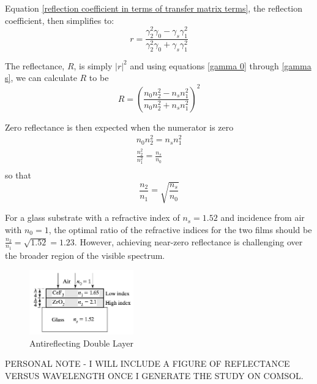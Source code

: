 Equation \ref{reflection coefficient in terms of transfer matrix terms}, the reflection coefficient, then simplifies to:
    \begin{equation}\label{reflection coefficient for 2-layer antireflecting films}
    r = \frac{\gamma_2^2\gamma_0 - \gamma_s\gamma_1^2}{\gamma_2^2\gamma_0 + \gamma_s\gamma_1^2}
    \end{equation}

The reflectance, $R$, is simply $|r|^2$ and using equations \ref{gamma 0} through \ref{gamma s}, we can calculate $R$ to be
    \begin{equation}\label{reflectance for 2-layer antireflecting films}
    R = \left(\frac{n_0n_2^2 - n_sn_1^2}{n_0n_2^2 + n_sn_1^2}\right)^2
    \end{equation}

Zero reflectance is then expected when the numerator is zero
    \begin{align*}
        n_0n_2^2 = n_sn_1^2 \\
        \frac{n_2^2}{n_1^2} = \frac{n_s}{n_0}  \\
    \end{align*} so that
    \begin{equation}\label{zero reflectance criterion}
    \frac{n_2}{n_1} = \sqrt{\frac{n_s}{n_0}}
    \end{equation}

For a glass substrate with a refractive index of $n_s = 1.52$ and incidence from air with $n_0 = 1$, the optimal ratio of the refractive indices for the two films should be $\frac{n_2}{n_1} = \sqrt{1.52} = 1.23$. However, achieving near-zero reflectance is challenging over the broader region of the visible spectrum.

\begin{figure}
  \centering
  \includegraphics[width=0.4\textwidth]{Chapters/Figures/Antireflecting Double Layer.jpeg}
  \caption{Antireflecting Double Layer}
\end{figure}

PERSONAL NOTE - I WILL INCLUDE A FIGURE OF REFLECTANCE VERSUS WAVELENGTH ONCE I GENERATE THE STUDY ON COMSOL.

